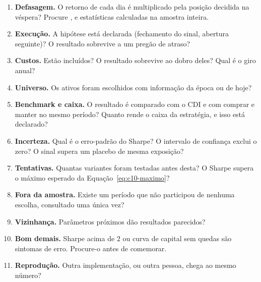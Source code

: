 \begin{enumerate}
  \item \textbf{Defasagem.} O retorno de cada dia é multiplicado pela posição decidida na véspera? Procure ,  e estatísticas calculadas na amostra inteira.
  \item \textbf{Execução.} A hipótese está declarada (fechamento do sinal, abertura seguinte)? O resultado sobrevive a um pregão de atraso?
  \item \textbf{Custos.} Estão incluídos? O resultado sobrevive ao dobro deles? Qual é o giro anual?
  \item \textbf{Universo.} Os ativos foram escolhidos com informação da época ou de hoje?
  \item \textbf{Benchmark e caixa.} O resultado é comparado com o CDI e com comprar e manter no mesmo período? Quanto rende o caixa da estratégia, e isso está declarado?
  \item \textbf{Incerteza.} Qual é o erro-padrão do Sharpe? O intervalo de confiança exclui o zero? O sinal supera um placebo de mesma exposição?
  \item \textbf{Tentativas.} Quantas variantes foram testadas antes desta? O Sharpe supera o máximo esperado da Equação~\eqref{eq:c10-maximo}?
  \item \textbf{Fora da amostra.} Existe um período que não participou de nenhuma escolha, consultado uma única vez?
  \item \textbf{Vizinhança.} Parâmetros próximos dão resultados parecidos?
  \item \textbf{Bom demais.} Sharpe acima de 2 ou curva de capital sem quedas são sintomas de erro. Procure-o antes de comemorar.
  \item \textbf{Reprodução.} Outra implementação, ou outra pessoa, chega ao mesmo número?
\end{enumerate}

